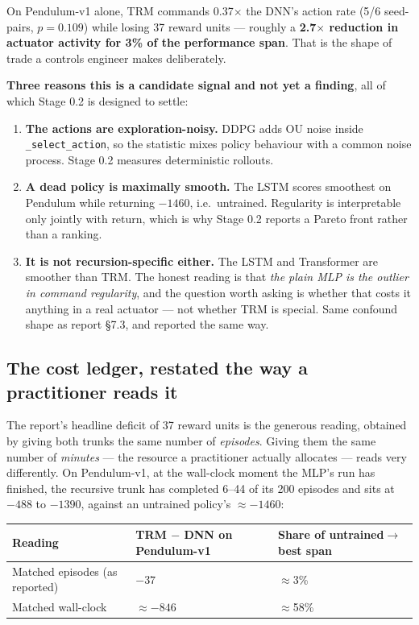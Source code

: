 \documentclass[11pt]{article}
\newcommand{\code}[1]{\texttt{\small #1}}
\begin{document}
On Pendulum-v1 alone, TRM commands 0.37$\times$ the DNN's action rate (5/6 seed-pairs, $p = 0.109$) while losing 37 reward units --- roughly a \textbf{2.7$\times$ reduction in actuator activity for 3\% of the performance span}. That is the shape of trade a controls engineer makes deliberately.

\textbf{Three reasons this is a candidate signal and not yet a finding}, all of which Stage 0.2 is designed to settle:

\begin{enumerate}[leftmargin=1.6em,itemsep=1pt]
\item \textbf{The actions are exploration-noisy.} DDPG adds OU noise inside \code{\_select\_action}, so the statistic mixes policy behaviour with a common noise process. Stage 0.2 measures deterministic rollouts.
\item \textbf{A dead policy is maximally smooth.} The LSTM scores smoothest on Pendulum while returning $-1460$, i.e.\ untrained. Regularity is interpretable only jointly with return, which is why Stage 0.2 reports a Pareto front rather than a ranking.
\item \textbf{It is not recursion-specific either.} The LSTM and Transformer are smoother than TRM. The honest reading is that \emph{the plain MLP is the outlier in command regularity}, and the question worth asking is whether that costs it anything in a real actuator --- not whether TRM is special. Same confound shape as report \S7.3, and reported the same way.
\end{enumerate}

\subsection{The cost ledger, restated the way a practitioner reads it}

The report's headline deficit of 37 reward units is the generous reading, obtained by giving both trunks the same number of \emph{episodes}. Giving them the same number of \emph{minutes} --- the resource a practitioner actually allocates --- reads very differently. On Pendulum-v1, at the wall-clock moment the MLP's run has finished, the recursive trunk has completed 6--44 of its 200 episodes and sits at $-488$ to $-1390$, against an untrained policy's $\approx -1460$:

\begin{center}
\begin{tabular}{@{}lp{}p{}@{}}
\toprule
\textbf{Reading} & \textbf{TRM $-$ DNN on Pendulum-v1} & \textbf{Share of untrained$\to$best span} \\
\midrule
Matched episodes (as reported) & $-37$ & $\approx$3\% \\
Matched wall-clock & $\approx -846$ & $\approx$58\% \\
\bottomrule
\end{tabular}
\end{center}
\end{document}
